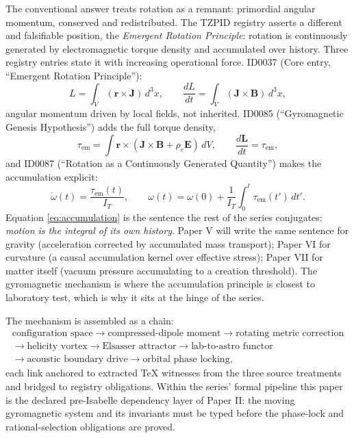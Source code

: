 \documentclass[11pt]{article}
\theoremstyle{remark}
\begin{document}
The conventional answer treats rotation as a remnant: primordial angular momentum, conserved and redistributed. The TZPID registry asserts a different and falsifiable position, the \emph{Emergent Rotation Principle}: rotation is continuously generated by electromagnetic torque density and accumulated over history. Three registry entries state it with increasing operational force. ID0037 (Core entry, ``Emergent Rotation Principle''):
\begin{equation}
L = \int_V (\mathbf{r} \times \mathbf{J})\, d^3x, \qquad
\frac{dL}{dt} = \int_V (\mathbf{J} \times \mathbf{B})\, d^3x,
\label{eq:emergentrotation}
\end{equation}
angular momentum driven by local fields, not inherited. ID0085 (``Gyromagnetic Genesis Hypothesis'') adds the full torque density,
\begin{equation}
\tau_{\mathrm{em}} = \int \mathbf{r} \times (\mathbf{J} \times \mathbf{B} + \rho_e \mathbf{E})\, dV, \qquad \frac{d\mathbf{L}}{dt} = \tau_{\mathrm{em}},
\end{equation}
and ID0087 (``Rotation as a Continuously Generated Quantity'') makes the accumulation explicit:
\begin{equation}
\dot{\omega}(t) = \frac{\tau_{\mathrm{em}}(t)}{I_T}, \qquad
\omega(t) = \omega(0) + \frac{1}{I_T} \int_0^t \tau_{\mathrm{em}}(t')\, dt'.
\label{eq:accumulation}
\end{equation}
Equation \eqref{eq:accumulation} is the sentence the rest of the series conjugates: \emph{motion is the integral of its own history}. Paper V will write the same sentence for gravity (acceleration corrected by accumulated mass transport); Paper VI for curvature (a causal accumulation kernel over effective stress); Paper VII for matter itself (vacuum pressure accumulating to a creation threshold). The gyromagnetic mechanism is where the accumulation principle is closest to laboratory test, which is why it sits at the hinge of the series.

The mechanism is assembled as a chain:
\begin{equation*}
\begin{gathered}
\text{configuration space} \to \text{compressed-dipole moment} \to \text{rotating metric correction} \\
\to \text{helicity vortex} \to \text{Elsasser attractor} \to \text{lab-to-astro functor} \\
\to \text{acoustic boundary drive} \to \text{orbital phase locking},
\end{gathered}
\end{equation*}
each link anchored to extracted TeX witnesses from the three source treatments and bridged to registry obligations. Within the series' formal pipeline this paper is the declared pre-Isabelle dependency layer of Paper II: the moving gyromagnetic system and its invariants must be typed before the phase-lock and rational-selection obligations are proved.
\end{document}
